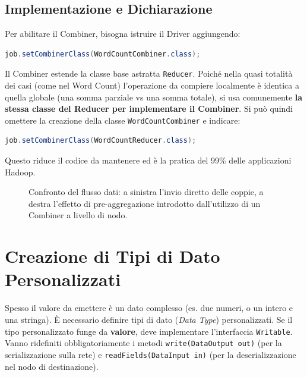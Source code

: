 \subsection{Implementazione e Dichiarazione}
Per abilitare il Combiner, bisogna istruire il Driver aggiungendo:
\begin{lstlisting}[language=Java]
job.setCombinerClass(WordCountCombiner.class);
\end{lstlisting}

Il Combiner estende la classe base astratta \texttt{Reducer}. Poiché nella quasi totalità dei casi (come nel Word Count) l'operazione da compiere localmente è identica a quella globale (una somma parziale vs una somma totale), si usa comunemente \textbf{la stessa classe del Reducer per implementare il Combiner}. Si può quindi omettere la creazione della classe \texttt{WordCountCombiner} e indicare:
\begin{lstlisting}[language=Java]
job.setCombinerClass(WordCountReducer.class);
\end{lstlisting}
Questo riduce il codice da mantenere ed è la pratica del 99\% delle applicazioni Hadoop.

\begin{figure}[H]
    \centering
    \caption{Confronto del flusso dati: a sinistra l'invio diretto delle coppie, a destra l'effetto di pre-aggregazione introdotto dall'utilizzo di un Combiner a livello di nodo.}
    \label{fig:combiner-comparison}
\end{figure}

\section{Creazione di Tipi di Dato Personalizzati}

Spesso il valore da emettere è un dato complesso (es. due numeri, o un intero e una stringa). È necessario definire tipi di dato (\textit{Data Type}) personalizzati.
Se il tipo personalizzato funge da \textbf{valore}, deve implementare l'interfaccia \texttt{Writable}. Vanno ridefiniti obbligatoriamente i metodi \texttt{write(DataOutput out)} (per la serializzazione sulla rete) e \texttt{readFields(DataInput in)} (per la deserializzazione nel nodo di destinazione).

